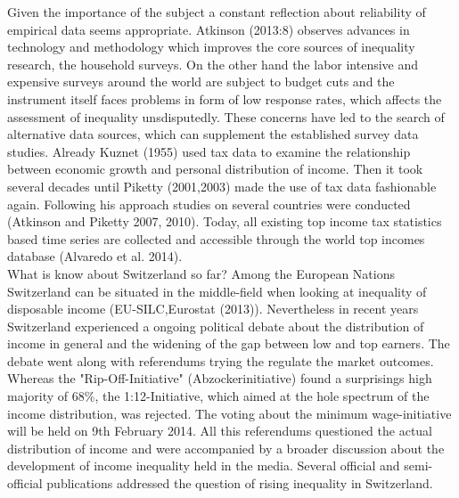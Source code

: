\documentclass[twoside]{article}
\begin{document}
\begin{multicols}{2}
Given the importance of the subject a constant reflection about reliability of empirical data seems appropriate. Atkinson (2013:8) observes advances in technology and methodology which improves the core sources of inequality research, the household surveys.  On the other hand the labor intensive and expensive surveys around the world are subject to budget cuts and the instrument itself faces problems in form of low response rates, which affects the assessment of inequality unsdisputedly. These concerns have led to the search of alternative data sources, which can supplement the established survey data studies. Already Kuznet (1955) used tax data to examine the relationship between economic growth and personal distribution of income. Then it took several decades until Piketty (2001,2003) made the use of tax data fashionable again. Following his approach studies on several countries were conducted (Atkinson and Piketty 2007, 2010). Today, all existing top income tax statistics based time series are collected and accessible through the world top incomes database (Alvaredo et al. 2014). \\

% 

What is know about Switzerland so far? Among the European Nations Switzerland can be situated in the middle-field when looking at inequality of disposable income (EU-SILC,Eurostat (2013)). Nevertheless in recent years Switzerland experienced  a ongoing political debate about the distribution of income in general and the widening of the gap between low and top earners. The debate went along with referendums trying the regulate the market outcomes. Whereas the "Rip-Off-Initiative" (Abzockerinitiative) found a surprisings high majority of 68\%, the 1:12-Initiative, which aimed at the hole spectrum of the income distribution, was rejected. The voting about the minimum wage-initiative will be held on 9th February 2014. All this referendums questioned the actual distribution of income and were accompanied by a broader discussion about the development of income inequality held in the media. Several official and semi-official publications addressed the question of rising inequality in Switzerland. \\




\end{multicols}
\end{document}

